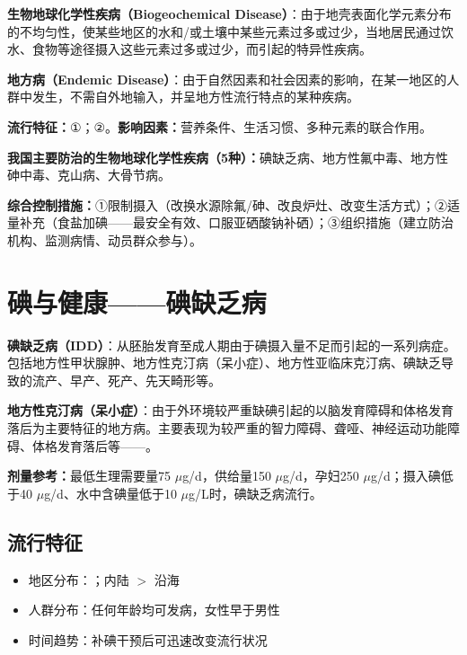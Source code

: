 \documentclass[10pt,a4paper,oneside]{ctexbook}
\begin{document}
\begin{defbox}
\textbf{生物地球化学性疾病（Biogeochemical Disease）}：由于地壳表面化学元素分布的不均匀性，使某些地区的水和/或土壤中某些元素过多或过少，当地居民通过饮水、食物等途径摄入这些元素过多或过少，而引起的特异性疾病。

\textbf{地方病（Endemic Disease）}：由于自然因素和社会因素的影响，在某一地区的人群中发生，不需自外地输入，并呈地方性流行特点的某种疾病。
\end{defbox}

\textbf{流行特征：}①；②。\textbf{影响因素：}营养条件、生活习惯、多种元素的联合作用。

\textbf{我国主要防治的生物地球化学性疾病（5种）：}碘缺乏病、地方性氟中毒、地方性砷中毒、克山病、大骨节病。

\textbf{综合控制措施：}①限制摄入（改换水源除氟/砷、改良炉灶、改变生活方式）；②适量补充（食盐加碘——最安全有效、口服亚硒酸钠补硒）；③组织措施（建立防治机构、监测病情、动员群众参与）。

\section{碘与健康——碘缺乏病}

\begin{defbox}
\textbf{碘缺乏病（IDD）}：从胚胎发育至成人期由于碘摄入量不足而引起的一系列病症。包括地方性甲状腺肿、地方性克汀病（呆小症）、地方性亚临床克汀病、碘缺乏导致的流产、早产、死产、先天畸形等。

\textbf{地方性克汀病（呆小症）}：由于外环境较严重缺碘引起的以脑发育障碍和体格发育落后为主要特征的地方病。主要表现为较严重的智力障碍、聋哑、神经运动功能障碍、体格发育落后等——。

\textbf{剂量参考：}最低生理需要量75 $\mu$g/d，供给量150 $\mu$g/d，孕妇250 $\mu$g/d；摄入碘低于40 $\mu$g/d、水中含碘量低于10 $\mu$g/L时，碘缺乏病流行。
\end{defbox}

\subsection{流行特征}

\begin{itemize}[leftmargin=*]
    \item 地区分布：；内陆 $>$ 沿海
    \item 人群分布：任何年龄均可发病，女性早于男性
    \item 时间趋势：补碘干预后可迅速改变流行状况
\end{itemize}
\end{document}
